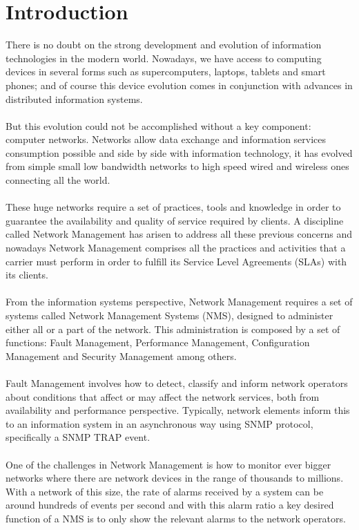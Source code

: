 \documentclass[10pt,a4paper]{article}
\begin{document}
 \section{Introduction}
 There is no doubt on the strong development and evolution of information technologies in the modern world. Nowadays, we have access to computing devices in several forms such as supercomputers, laptops, tablets and smart phones; and of course this device evolution comes in conjunction with advances in distributed information systems.
 \\\\
 But this evolution could not be accomplished without a key component: computer networks. Networks allow data exchange and information services consumption possible and side by side with information technology, it has evolved from simple small low bandwidth networks to high speed wired and wireless ones connecting all the world.
 \\\\
 These huge networks require a set of practices, tools and knowledge in order to guarantee the availability and quality of service required by clients. A discipline called Network Management has arisen to address all these previous concerns and nowadays Network Management comprises all the practices and activities that a carrier must perform in order to fulfill its Service Level Agreements (SLAs) with its clients.
 \\\\
 From the information systems perspective, Network Management requires a set of systems called Network Management Systems (NMS), designed to administer either all or a part of the network. This administration is composed by a set of functions: Fault Management, Performance Management, Configuration Management and Security Management among others.
 \\\\
 Fault Management involves how to detect, classify and inform network operators about conditions that affect or may affect the network services, both from availability and performance perspective. Typically, network elements inform this to an  information system in an asynchronous way using SNMP protocol, specifically a SNMP TRAP event.
 \\\\
 One of the challenges in Network Management is how to monitor ever bigger networks where there are network devices in the range of thousands to millions. With a network of this size, the rate of alarms received by a system can be around hundreds of events per second and with this alarm ratio a key desired function of a NMS is to only show the relevant alarms to the network operators.
\end{document}
